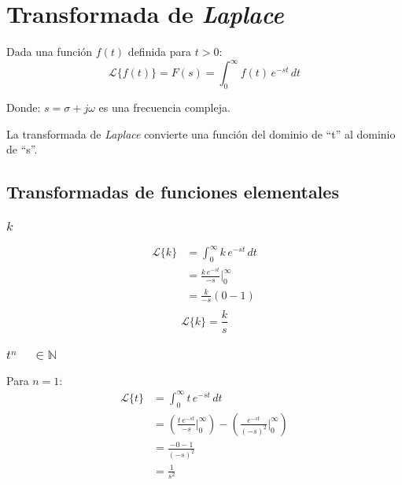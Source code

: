 \chapter{Transformada de \emph{Laplace}}

Dada una función $f(t)$ definida para $t>0$:
\begin{equation}
    \mathcal{L}\{f(t)\}=F(s)=\int_0^{\infty}f(t)\,e^{-st}\,dt
\end{equation}

Donde: $s=\sigma+j\omega$ es una frecuencia compleja.

La transformada de \emph{Laplace} convierte una función del dominio de ``t'' al
dominio de ``s''.

\section{Transformadas de funciones elementales}

\subsection{$k$}
\begin{equation*}
\begin{split}
    \mathcal{L}\{k\}
        &=\int_{0}^{\infty}k\,e^{-st}\,dt\\
        &=\frac{k\,e^{-st}}{-s}\Biggr|_0^{\infty}\\
        &=\frac{k}{-s}(0-1)\\
\end{split}
\end{equation*}
\begin{equation}
    \mathcal{L}\{k\}=\frac{k}{s}
\end{equation}

\subsection{$t^n\quad\,\in\mathbb{N}$}
Para $n=1$:
\begin{equation*}
\begin{split}
    \mathcal{L}\{t\}
        &=\int_0^{\infty}t\,e^{-st}\,dt\\
        &=\left(\frac{t\,e^{-st}}{-s}\Biggr|_0^{\infty}\right)
        -\left(\frac{e^{-st}}{{(-s)}^2}\Biggr|_0^{\infty}\right)\\
        &=\frac{-0-1}{{(-s)}^2}\\
        &=\frac{1}{s^2}
\end{split}
\end{equation*}

